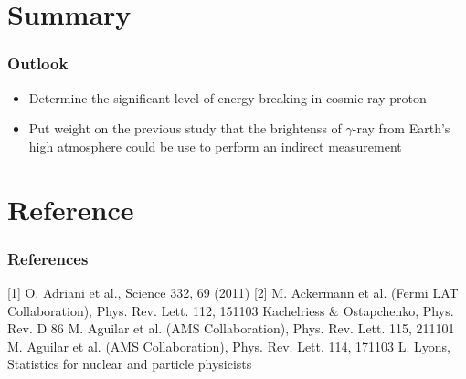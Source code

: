 \documentclass{beamer}
\begin{document}



\section{Summary}
\begin{frame}
\frametitle{Outlook}
\begin{itemize}
\item Determine the significant level of energy breaking in cosmic ray proton
\item Put weight on the previous study that the brightenss of $\gamma$-ray from Earth's high atmosphere could be use to perform an indirect measurement
\end{itemize}
\end{frame}




\section{} %

\section{Reference}
\begin{frame}
\frametitle{References}
[1] O. Adriani et al., Science 332, 69 (2011)
[2] M. Ackermann et al. (Fermi LAT Collaboration), Phys. Rev. Lett. 112, 151103 \newline
[3] Kachelriess $\&$ Ostapchenko, Phys. Rev. D 86 \newline
[4] M. Aguilar et al. (AMS Collaboration), Phys. Rev. Lett. 115, 211101 \newline
[5] M. Aguilar et al. (AMS Collaboration), Phys. Rev. Lett. 114, 171103 \newline
[6] L. Lyons, Statistics for nuclear and particle physicists
\end{frame}
\end{document}

